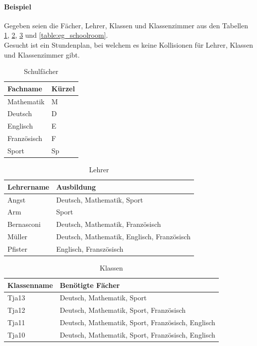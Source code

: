 	\paragraph{Beispiel} Gegeben seien die Fächer, Lehrer, Klassen und Klassenzimmer aus den Tabellen \ref{table:eg_subject}, \ref{table:eg_teacher}, \ref{table:eg_schoolclasses} und \ref{table:eg_schoolroom}.\\
Gesucht ist ein Stundenplan, bei welchem es keine Kollisionen für Lehrer, Klassen und Klassenzimmer gibt.

\begin{table}[ht]
\centering
  \begin{tabular}{ l | l }
	\hline
	\rowcolor{gray}
	\textbf{Fachname}	& \textbf{Kürzel}\\ \hline
	Mathematik		& M\\ \hline
	Deutsch		& D\\ \hline
	Englisch		& E\\ \hline
	Französisch		& F\\ \hline
	Sport			& Sp
  \end{tabular}
   \caption{Schulfächer}\label{table:eg_subject}
\end{table}

\begin{table}[ht]
\centering
  \begin{tabular}{ l | l }
	\hline
	\rowcolor{gray}
	\textbf{Lehrername} 	& \textbf{Ausbildung}\\ \hline
	Angst				& Deutsch, Mathematik, Sport\\ \hline
	Arm				& Sport\\ \hline
	Bernasconi			& Deutsch, Mathematik, Französisch\\ \hline
	Müller				& Deutsch, Mathematik, Englisch, Französisch\\ \hline
	Pfister				& Englisch, Franszösisch
  \end{tabular}
   \caption{Lehrer}\label{table:eg_teacher}
\end{table}

\begin{table}[ht]
\centering
  \begin{tabular}{ l | l }
	\hline
	\rowcolor{gray}
	\textbf{Klassenname} 	& \textbf{Benötigte Fächer}\\ \hline
	Tja13				& Deutsch, Mathematik, Sport\\ \hline
	Tja12				& Deutsch, Mathematik, Sport, Französisch\\ \hline
	Tja11				& Deutsch, Mathematik, Sport, Französisch, Englisch\\ \hline
	Tja10				& Deutsch, Mathematik, Sport, Französisch, Englisch
  \end{tabular}
   \caption{Klassen}\label{table:eg_schoolclasses}
\end{table}

